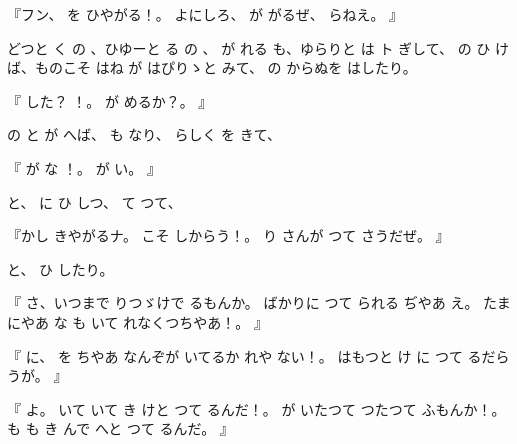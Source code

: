 『フン、
を
ひやがる！。
よにしろ、
が
がるぜ、
らねえ。
』

どつと
く
の
、ひゆーと
る
の
、
が
れる
も、ゆらりと
は
ト
ぎして、
の
ひ
けば、ものこそ
はね
が
はぴりゝと
みて、
の
からぬを
はしたり。

『
した？
！。
が
めるか？。
』

の
と
が
へば、
も
なり、
らしく
を
きて、

『
が
な
！。
が
い。
』

と、
に
ひ
しつ、
て
つて、

『かし
きやがるナ。
こそ
しからう！。
り
さんが
つて
さうだぜ。
』

と、
ひ
したり。

『
さ、いつまで
りつゞけで
るもんか。
ばかりに
つて
られる
ぢやあ
え。
たまにやあ
な
も
いて
れなくつちやあ！。
』

『
に、
を
ちやあ
なんぞが
いてるか
れや
ない！。
はもつと
け
に
つて
るだらうが。
』

『
よ。
いて
いて
き
けと
つて
るんだ！。
が
いたつて
つたつて
ふもんか！。
も
も
き
んで
へと
つて
るんだ。
』

